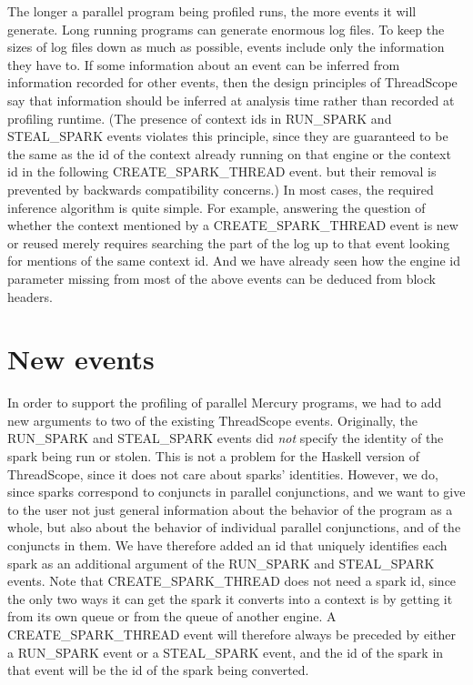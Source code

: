 \noindent
The longer a parallel program being profiled runs,
the more events it will generate.
Long running programs can generate enormous log files.
To keep the sizes of log files down as much as possible,
events include only the information they have to.
If some information about an event
can be inferred from information recorded for other events,
then the design principles of ThreadScope say
that information should be inferred at analysis time
rather than recorded at profiling runtime.
(The presence of context ids in RUN\_SPARK and STEAL\_SPARK events
violates this principle,
since they are guaranteed to be the same as the id of the context already
running on that engine or
the context id in the following CREATE\_SPARK\_THREAD event.
but their removal is prevented by backwards compatibility concerns.)
In most cases, the required inference algorithm is quite simple.
For example, answering the question of whether the context
mentioned by a CREATE\_SPARK\_THREAD event is new or reused
merely requires searching the part of the log up to that event
looking for mentions of the same context id.
And we have already seen how the engine id parameter
missing from most of the above events
can be deduced from block headers.

\section{New events}
\label{sec:newevents}

In order to support the profiling of parallel Mercury programs,
we had to add new arguments to two of the existing ThreadScope events.
Originally, the RUN\_SPARK and STEAL\_SPARK events
did \emph{not} specify the identity of the spark being run or stolen.
This is not a problem for the Haskell version of ThreadScope,
since it does not care about sparks' identities.
However, we do, since sparks correspond to conjuncts in parallel conjunctions,
and we want to give to the user not just general information
about the behavior of the program as a whole,
but also about the behavior of individual parallel conjunctions,
and of the conjuncts in them.
We have therefore added an id that uniquely identifies each spark
as an additional argument of the RUN\_SPARK and STEAL\_SPARK events.
Note that CREATE\_SPARK\_THREAD does not need a spark id,
since the only two ways it can get the spark it converts into a context
is by getting it from its own queue or from the queue of another engine.
A CREATE\_SPARK\_THREAD event will therefore always be preceded
by either a RUN\_SPARK event or a STEAL\_SPARK event,
and the id of the spark in that event
will be the id of the spark being converted.

